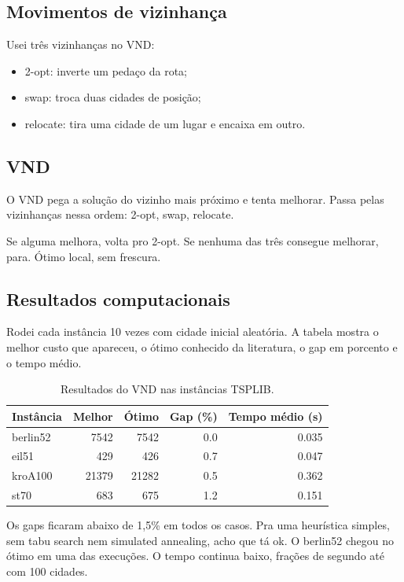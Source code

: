 \documentclass[12pt,a4paper]{article}
\begin{document}
\subsection{Movimentos de vizinhança}

Usei três vizinhanças no VND:
\begin{itemize}
    \item 2-opt: inverte um pedaço da rota;
    \item swap: troca duas cidades de posição;
    \item relocate: tira uma cidade de um lugar e encaixa em outro.
\end{itemize}

\subsection{VND}

O VND pega a solução do vizinho mais próximo e tenta melhorar. Passa pelas vizinhanças nessa ordem: 2-opt, swap, relocate.

Se alguma melhora, volta pro 2-opt. Se nenhuma das três consegue melhorar, para. Ótimo local, sem frescura.

\subsection{Resultados computacionais}

Rodei cada instância 10 vezes com cidade inicial aleatória. A tabela mostra o melhor custo que apareceu, o ótimo conhecido da literatura, o gap em porcento e o tempo médio.

\begin{table}[h]
\centering
\begin{tabular}{lrrrr}
\hline
Instância & Melhor & Ótimo & Gap (\%) & Tempo médio (s) \\
\hline
berlin52 & 7542 & 7542 & 0.0 & 0.035 \\
eil51    & 429  & 426  & 0.7 & 0.047 \\
kroA100  & 21379 & 21282 & 0.5 & 0.362 \\
st70     & 683  & 675  & 1.2 & 0.151 \\
\hline
\end{tabular}
\caption{Resultados do VND nas instâncias TSPLIB.}
\end{table}

Os gaps ficaram abaixo de 1,5\% em todos os casos. Pra uma heurística simples, sem tabu search nem simulated annealing, acho que tá ok. O berlin52 chegou no ótimo em uma das execuções. O tempo continua baixo, frações de segundo até com 100 cidades.
\end{document}
